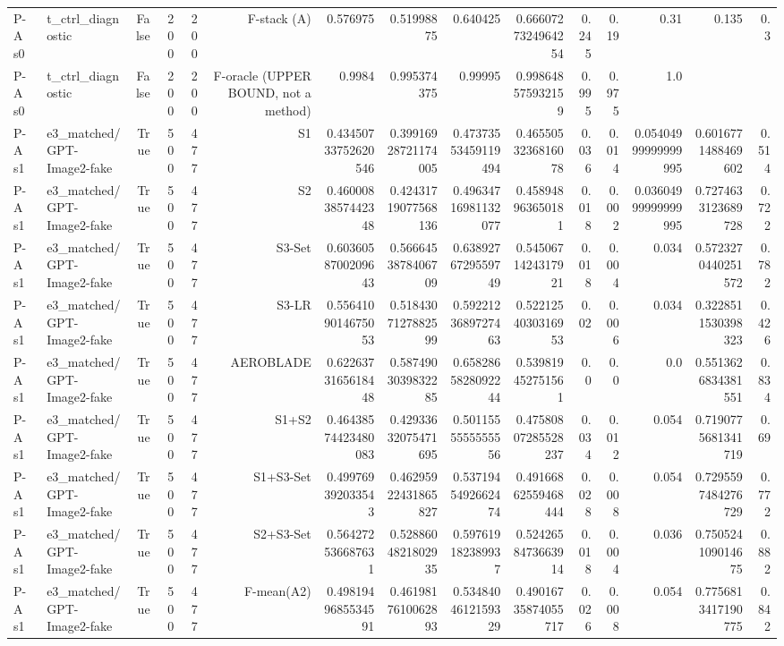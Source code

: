 \begin{table}[htbp]
\begin{tabular}{llrrrrrrrrrrrrr}
P-A s0 & t\_ctrl\_diagnostic & False & 200 & 200 & F-stack (A) & 0.576975 & 0.51998875 & 0.640425 & 0.6660727324964254 & 0.245 & 0.19 & 0.31 & 0.135 & 0.3 \\
P-A s0 & t\_ctrl\_diagnostic & False & 200 & 200 & F-oracle (UPPER BOUND, not a method) & 0.9984 & 0.995374375 & 0.99995 & 0.998648575932159 & 0.995 & 0.975 & 1.0 &  &  \\
P-A s1 & e3\_matched/GPT-Image2-fake & True & 500 & 477 & S1 & 0.43450733752620546 & 0.39916928721174005 & 0.47373553459119494 & 0.4655053236816078 & 0.036 & 0.014 & 0.05404999999999995 & 0.6016771488469602 & 0.514 \\
P-A s1 & e3\_matched/GPT-Image2-fake & True & 500 & 477 & S2 & 0.4600083857442348 & 0.42431719077568136 & 0.49634716981132077 & 0.458948963650181 & 0.018 & 0.002 & 0.03604999999999995 & 0.7274633123689728 & 0.722 \\
P-A s1 & e3\_matched/GPT-Image2-fake & True & 500 & 477 & S3-Set & 0.6036058700209643 & 0.5666453878406709 & 0.6389276729559749 & 0.5450671424317921 & 0.018 & 0.004 & 0.034 & 0.5723270440251572 & 0.782 \\
P-A s1 & e3\_matched/GPT-Image2-fake & True & 500 & 477 & S3-LR & 0.5564109014675053 & 0.5184307127882599 & 0.5922123689727463 & 0.5221254030316953 & 0.02 & 0.006 & 0.034 & 0.3228511530398323 & 0.426 \\
P-A s1 & e3\_matched/GPT-Image2-fake & True & 500 & 477 & AEROBLADE & 0.6226373165618448 & 0.5874903039832285 & 0.6582865828092244 & 0.539819452751561 & 0.0 & 0.0 & 0.0 & 0.5513626834381551 & 0.834 \\
P-A s1 & e3\_matched/GPT-Image2-fake & True & 500 & 477 & S1+S2 & 0.46438574423480083 & 0.42933632075471695 & 0.5011555555555556 & 0.47580807285528237 & 0.034 & 0.012 & 0.054 & 0.7190775681341719 & 0.69 \\
P-A s1 & e3\_matched/GPT-Image2-fake & True & 500 & 477 & S1+S3-Set & 0.499769392033543 & 0.46295922431865827 & 0.5371945492662474 & 0.49166862559468444 & 0.028 & 0.008 & 0.054 & 0.7295597484276729 & 0.772 \\
P-A s1 & e3\_matched/GPT-Image2-fake & True & 500 & 477 & S2+S3-Set & 0.564272536687631 & 0.5288604821802935 & 0.597619182389937 & 0.5242658473663914 & 0.018 & 0.004 & 0.036 & 0.750524109014675 & 0.882 \\
P-A s1 & e3\_matched/GPT-Image2-fake & True & 500 & 477 & F-mean(A2) & 0.4981949685534591 & 0.4619817610062893 & 0.5348404612159329 & 0.49016735874055717 & 0.026 & 0.008 & 0.054 & 0.7756813417190775 & 0.842 \\

\end{tabular}
\end{table}
